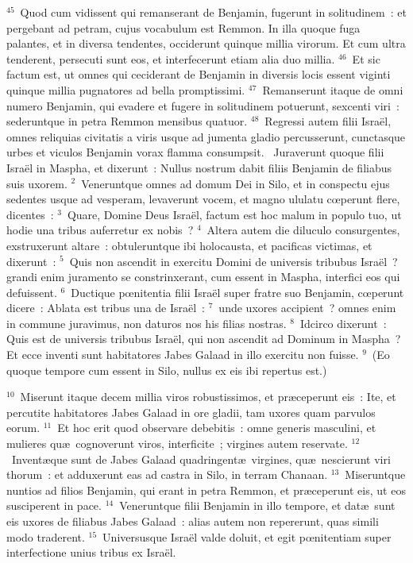 ${}^{45}$~Quod cum vidissent qui remanserant de Benjamin, fugerunt in solitudinem~: et pergebant ad petram, cujus vocabulum est Remmon. In illa quoque fuga palantes, et in diversa tendentes, occiderunt quinque millia virorum. Et cum ultra tenderent, persecuti sunt eos, et interfecerunt etiam alia duo millia.
${}^{46}$~Et sic factum est, ut omnes qui ceciderant de Benjamin in diversis locis essent viginti quinque millia pugnatores ad bella promptissimi.
${}^{47}$~Remanserunt itaque de omni numero Benjamin, qui evadere et fugere in solitudinem potuerunt, sexcenti viri~: sederuntque in petra Remmon mensibus quatuor.
${}^{48}$~Regressi autem filii Isra\"el, omnes reliquias civitatis a viris usque ad jumenta gladio percusserunt, cunctasque urbes et viculos Benjamin vorax flamma consumpsit.
~Juraverunt quoque filii Isra\"el in Maspha, et dixerunt~: Nullus nostrum dabit filiis Benjamin de filiabus suis uxorem.
${}^{2}$~Veneruntque omnes ad domum Dei in Silo, et in conspectu ejus sedentes usque ad vesperam, levaverunt vocem, et magno ululatu cœperunt flere, dicentes~:
${}^{3}$~Quare, Domine Deus Isra\"el, factum est hoc malum in populo tuo, ut hodie una tribus auferretur ex nobis~?
${}^{4}$~Altera autem die diluculo consurgentes, exstruxerunt altare~: obtuleruntque ibi holocausta, et pacificas victimas, et dixerunt~:
${}^{5}$~Quis non ascendit in exercitu Domini de universis tribubus Isra\"el~? grandi enim juramento se constrinxerant, cum essent in Maspha, interfici eos qui defuissent.
${}^{6}$~Ductique pœnitentia filii Isra\"el super fratre suo Benjamin, cœperunt dicere~: Ablata est tribus una de Isra\"el~:
${}^{7}$~unde uxores accipient~? omnes enim in commune juravimus, non daturos nos his filias nostras.
${}^{8}$~Idcirco dixerunt~: Quis est de universis tribubus Isra\"el, qui non ascendit ad Dominum in Maspha~? Et ecce inventi sunt habitatores Jabes Galaad in illo exercitu non fuisse.
${}^{9}$~(Eo quoque tempore cum essent in Silo, nullus ex eis ibi repertus est.)


${}^{10}$~Miserunt itaque decem millia viros robustissimos, et pr\ae ceperunt eis~: Ite, et percutite habitatores Jabes Galaad in ore gladii, tam uxores quam parvulos eorum.
${}^{11}$~Et hoc erit quod observare debebitis~: omne generis masculini, et mulieres qu\ae\ cognoverunt viros, interficite~; virgines autem reservate.
${}^{12}$~Invent\ae que sunt de Jabes Galaad quadringent\ae\ virgines, qu\ae\ nescierunt viri thorum~: et adduxerunt eas ad castra in Silo, in terram Chanaan.
${}^{13}$~Miseruntque nuntios ad filios Benjamin, qui erant in petra Remmon, et pr\ae ceperunt eis, ut eos susciperent in pace.
${}^{14}$~Veneruntque filii Benjamin in illo tempore, et dat\ae\ sunt eis uxores de filiabus Jabes Galaad~: alias autem non repererunt, quas simili modo traderent.
${}^{15}$~Universusque Isra\"el valde doluit, et egit pœnitentiam super interfectione unius tribus ex Isra\"el.



